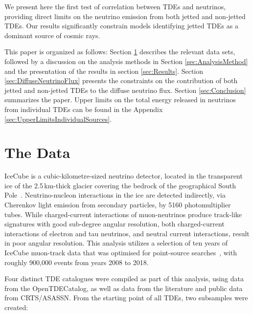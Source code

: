 \documentclass[twocolumn, tighten, linenumbers]{aastex62}
\begin{document}
We present here the first test of correlation between TDEs and neutrinos, providing direct limits on the neutrino emission from both jetted and non-jetted TDEs. Our results significantly constrain models identifying jetted TDEs as a dominant source of cosmic rays.

This paper is organized as follows: Section \ref{sec:data} describes the relevant data sets, followed by a discussion on the analysis methods in Section \ref{sec:AnalysisMethod} and the presentation of the results in section \ref{sec:Results}. Section \ref{sec:DiffuseNeutrinoFlux} presents the constraints on the contribution of both jetted and non-jetted TDEs to the diffuse neutrino flux. Section \ref{sec:Conclusion} summarizes the paper. Upper limits on the total energy released in neutrinos from individual TDEs can be found in the Appendix \ref{sec:UpperLimitsIndividualSources}.


\section{The Data}
\label{sec:data}
IceCube is a cubic-kilometre-sized neutrino detector, located in the transparent ice of the 2.5\,km-thick glacier covering the bedrock of the geographical South Pole~\citep{Aartsen:2016nxy}.
Neutrino-nucleon interactions in the ice are detected indirectly, via Cherenkov light emission from secondary particles, by 5160 photomultiplier tubes. While charged-current interactions of muon-neutrinos produce track-like signatures with good sub-degree angular resolution, both charged-current interactions of electron and tau neutrinos, and neutral current interactions, result in poor angular resolution. This analysis utilizes a selection of ten years of IceCube muon-track data that was optimised for point-source searches~\citep{Aartsen:2016oji}, with roughly 900,000 events from years 2008 to 2018.

Four distinct TDE catalogues were compiled as part of this analysis, using data from the OpenTDECatalog, as well as data from the literature and public data from CRTS/ASASSN. From the starting point of all TDEs, two subsamples were created:
\end{document}
